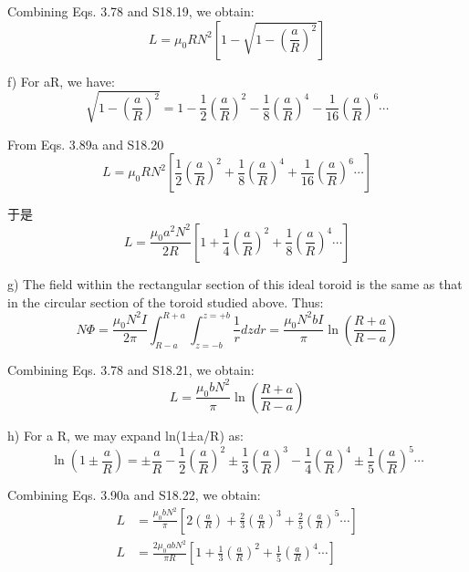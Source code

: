 Combining Eqs. 3.78 and S18.19, we obtain:
 \begin{equation}%
L=\mu_0RN^2[1-\sqrt{1-(\frac{a}{R})^2}]
\end{equation}

f) For aR, we have:
 \begin{equation}%
\sqrt{1-(\frac{a}{R})^2}=1-\frac{1}{2}(\frac{a}{R})^2-\frac{1}{8}(\frac{a}{R})^4-\frac{1}{16}(\frac{a}{R})^6\cdots
\end{equation}

From Eqs. 3.89a and S18.20
\begin{equation}
L=\mu_0RN^2[\frac{1}{2}(\frac{a}{R})^2+\frac{1}{8}(\frac{a}{R})^4+\frac{1}{16}(\frac{a}{R})^6\cdots]
\end{equation}

于是
 \begin{equation}%
L=\frac{\mu_0a^2N^2}{2R}[1+\frac{1}{4}(\frac{a}{R})^2+\frac{1}{8}(\frac{a}{R})^4\cdots]
\end{equation}

g) The field within the rectangular section of this ideal toroid is the same as that
in the circular section of the toroid studied above. Thus:
 \begin{equation}%
N\Phi=\frac{\mu_0N^2I}{2\pi}\int_{R-a}^{R+a}\int_{z=-b}^{z=+b}\frac{1}{r}dzdr
=\frac{\mu_0N^2bI}{\pi}\ln(\frac{R+a}{R-a})
\end{equation}

Combining Eqs. 3.78 and S18.21, we obtain:
 \begin{equation}%
L=\frac{\mu_0bN^2}{\pi}\ln(\frac{R+a}{R-a})
\end{equation}

h) For a  R, we may expand ln(1±a/R) as:
 \begin{equation}%
\ln(1\pm\frac{a}{R})=\pm\frac{a}{R}-\frac{1}{2}(\frac{a}{R})^2\pm\frac{1}{3}(\frac{a}{R})^3-\frac{1}{4}(\frac{a}{R})^4\pm\frac{1}{5}(\frac{a}{R})^5\cdots
\end{equation}

Combining Eqs. 3.90a and S18.22, we obtain:
 \begin{eqnarray}%
L&=\frac{\mu_0bN^2}{\pi}\left[2(\frac{a}{R})+\frac{2}{3}(\frac{a}{R})^3+\frac{2}{5}(\frac{a}{R})^5\cdots\right]\\
L&=\frac{2\mu_0abN^2}{\pi R}\left[1+\frac{1}{3}(\frac{a}{R})^2+\frac{1}{5}(\frac{a}{R})^4\cdots\right]
\end{eqnarray}

\newpage



